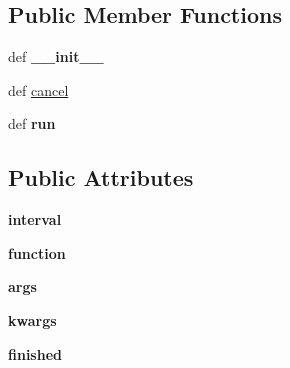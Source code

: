 \subsection*{Public Member Functions}
\begin{DoxyCompactItemize}
\item 
\hypertarget{classcore_1_1misc_1_1event_1_1_event_loop_1_1_timer_a9aa568c3695ec18b753186c3fcf565dd}{def {\bfseries \+\_\+\+\_\+init\+\_\+\+\_\+}}\label{classcore_1_1misc_1_1event_1_1_event_loop_1_1_timer_a9aa568c3695ec18b753186c3fcf565dd}

\item 
def \hyperlink{classcore_1_1misc_1_1event_1_1_event_loop_1_1_timer_a616dc06f91fb02c1a551d795d915277e}{cancel}
\item 
\hypertarget{classcore_1_1misc_1_1event_1_1_event_loop_1_1_timer_af975017aaa70f5061b3cc7362db97f90}{def {\bfseries run}}\label{classcore_1_1misc_1_1event_1_1_event_loop_1_1_timer_af975017aaa70f5061b3cc7362db97f90}

\end{DoxyCompactItemize}
\subsection*{Public Attributes}
\begin{DoxyCompactItemize}
\item 
\hypertarget{classcore_1_1misc_1_1event_1_1_event_loop_1_1_timer_a39ab7588a87bad5a8976e507440019f3}{{\bfseries interval}}\label{classcore_1_1misc_1_1event_1_1_event_loop_1_1_timer_a39ab7588a87bad5a8976e507440019f3}

\item 
\hypertarget{classcore_1_1misc_1_1event_1_1_event_loop_1_1_timer_aa1b36c6509f5c8bff719431c4389999d}{{\bfseries function}}\label{classcore_1_1misc_1_1event_1_1_event_loop_1_1_timer_aa1b36c6509f5c8bff719431c4389999d}

\item 
\hypertarget{classcore_1_1misc_1_1event_1_1_event_loop_1_1_timer_a4bda9ae6fd1ab7459f8587c865b97ca9}{{\bfseries args}}\label{classcore_1_1misc_1_1event_1_1_event_loop_1_1_timer_a4bda9ae6fd1ab7459f8587c865b97ca9}

\item 
\hypertarget{classcore_1_1misc_1_1event_1_1_event_loop_1_1_timer_ab5459cb2feea74177061d3f5c9cb035f}{{\bfseries kwargs}}\label{classcore_1_1misc_1_1event_1_1_event_loop_1_1_timer_ab5459cb2feea74177061d3f5c9cb035f}

\item 
\hypertarget{classcore_1_1misc_1_1event_1_1_event_loop_1_1_timer_a7be3c12d370070ee83b2ce3a32b6837f}{{\bfseries finished}}\label{classcore_1_1misc_1_1event_1_1_event_loop_1_1_timer_a7be3c12d370070ee83b2ce3a32b6837f}

\end{DoxyCompactItemize}


